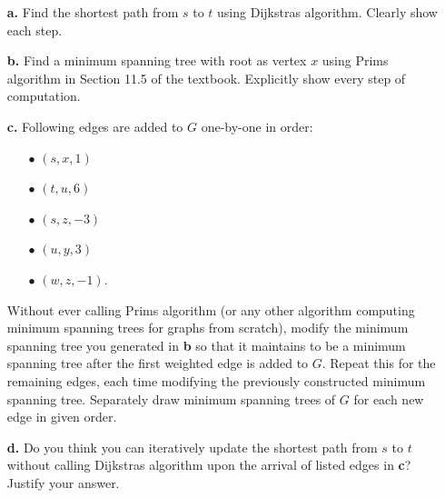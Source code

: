\documentclass[11pt]{article}
\begin{document}
\begin{itemize}
	\item[\textbf{a.}] Find the shortest path from $s$ to $t$ using Dijkstra\textquotesingle s algorithm. Clearly show each step. \hfill {}
	\item[\textbf{b.}] Find a minimum spanning tree with root as vertex $x$ using Prim\textquotesingle s algorithm in Section 11.5 of the textbook. Explicitly show every step of computation. \hfill {}
	\item[\textbf{c.}] Following edges are added to $G$ one-by-one in order:
	\begin{itemize}
	\item[$\bullet$] $(s, x, 1)$
	\item[$\bullet$] $(t, u, 6)$
	\item[$\bullet$] $(s, z, -3)$
	\item[$\bullet$] $(u, y, 3)$
	\item[$\bullet$] $(w, z, -1)$.
	\end{itemize}
	Without ever calling Prim\textquotesingle s algorithm (or any other algorithm computing minimum spanning trees for graphs from scratch), modify the minimum spanning tree you generated in \textbf{b} so that it maintains to be a minimum spanning tree after the first weighted edge is added to $G$. Repeat this for the remaining edges, each time modifying the previously constructed minimum spanning tree. Separately draw minimum spanning trees of $G$ for each new edge in given order. \hfill {}
	\item[\textbf{d.}] Do you think you can iteratively update the shortest path from $s$ to $t$ without calling Dijkstra\textquotesingle s algorithm upon the arrival of listed edges in \textbf{c}? Justify your answer. \hfill {}
\end{itemize}
\end{document}
